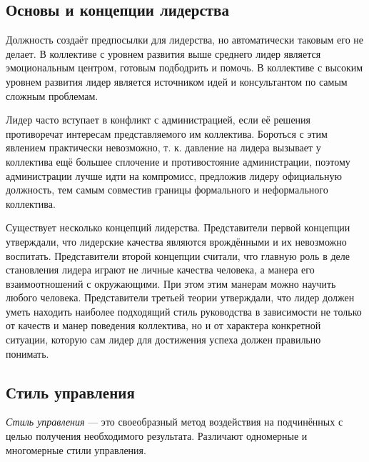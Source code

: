 \documentclass[12pt, russian, oneside, article]{ncc}
\begin{document}
\subsection{Основы и концепции лидерства}
\label{sec-3_3}


Должность создаёт предпосылки для лидерства, но автоматически таковым его не делает. В коллективе с уровнем развития выше среднего лидер является эмоциональным центром, готовым подбодрить и помочь. В коллективе с высоким уровнем развития лидер является источником идей и консультантом по самым сложным проблемам.

Лидер часто вступает в конфликт с администрацией, если её решения противоречат интересам представляемого им коллектива. Бороться с этим явлением практически невозможно, т. к. давление на лидера вызывает у коллектива ещё большее сплочение и противостояние администрации, поэтому администрации лучше идти на компромисс, предложив лидеру официальную должность, тем самым совместив границы формального и неформального коллектива.

Существует несколько концепций лидерства. Представители первой концепции утверждали, что лидерские качества являются врождёнными и их невозможно воспитать. Представители второй концепции считали, что главную роль в деле становления лидера играют не личные качества человека, а манера его взаимоотношений с окружающими. При этом этим манерам можно научить любого человека. Представители третьей теории утверждали, что лидер должен уметь находить наиболее подходящий стиль руководства в зависимости не только от качеств и манер поведения коллектива, но и от характера конкретной ситуации, которую сам лидер для достижения успеха должен правильно понимать.  
\subsection{Стиль управления}
\label{sec-3_4}


\emph{Стиль управления} --- это своеобразный метод воздействия на подчинённых с целью получения необходимого результата. Различают одномерные и многомерные стили управления.
\end{document}

